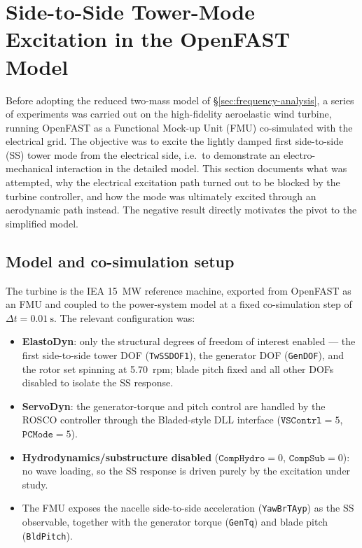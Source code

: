 
\section{Side-to-Side Tower-Mode Excitation in the OpenFAST Model}
\label{sec:openfast-excitation}

Before adopting the reduced two-mass model of
\S\ref{sec:frequency-analysis}, a series of experiments was carried out on the
high-fidelity aeroelastic wind turbine, running OpenFAST as a Functional
Mock-up Unit (FMU) co-simulated with the electrical grid. The objective was to
excite the lightly damped first side-to-side (SS) tower mode from the
electrical side, i.e.\ to demonstrate an electro-mechanical interaction in the
detailed model. This section documents what was attempted, why the electrical
excitation path turned out to be blocked by the turbine controller, and how the
mode was ultimately excited through an aerodynamic path instead. The negative
result directly motivates the pivot to the simplified model.

\subsection{Model and co-simulation setup}
\label{subsec:of-setup}

The turbine is the IEA \SI{15}{\mega\watt} reference machine, exported from
OpenFAST as an FMU and coupled to the power-system model at a fixed
co-simulation step of $\Delta t = \SI{0.01}{\second}$. The relevant
configuration was:
\begin{itemize}
  \item \textbf{ElastoDyn}: only the structural degrees of freedom of interest
  enabled --- the first side-to-side tower DOF (\texttt{TwSSDOF1}), the
  generator DOF (\texttt{GenDOF}), and the rotor set spinning at
  \SI{5.70}{rpm}; blade pitch fixed and all other DOFs disabled to isolate the
  SS response.
  \item \textbf{ServoDyn}: the generator-torque and pitch control are handled by
  the ROSCO controller through the Bladed-style DLL interface
  ($\texttt{VSContrl}=5$, $\texttt{PCMode}=5$).
  \item \textbf{Hydrodynamics/substructure disabled} ($\texttt{CompHydro}=0$,
  $\texttt{CompSub}=0$): no wave loading, so the SS response is driven purely by
  the excitation under study.
  \item The FMU exposes the nacelle side-to-side acceleration
  (\texttt{YawBrTAyp}) as the SS observable, together with the generator torque
  (\texttt{GenTq}) and blade pitch (\texttt{BldPitch}).
\end{itemize}

